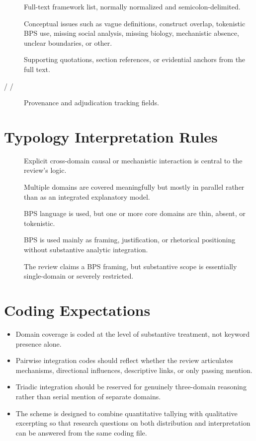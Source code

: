 \documentclass[11pt]{article}
\begin{document}
\begin{description}
\item[] Full-text framework list, normally normalized and semicolon-delimited.
\item[] Conceptual issues such as vague definitions, construct overlap, tokenistic BPS use, missing social analysis, missing biology, mechanistic absence, unclear boundaries, or other.
\item[] Supporting quotations, section references, or evidential anchors from the full text.
\item[ /  / ] Provenance and adjudication tracking fields.
\end{description}

\section*{Typology Interpretation Rules}
\begin{description}
\item[] Explicit cross-domain causal or mechanistic interaction is central to the review's logic.
\item[] Multiple domains are covered meaningfully but mostly in parallel rather than as an integrated explanatory model.
\item[] BPS language is used, but one or more core domains are thin, absent, or tokenistic.
\item[] BPS is used mainly as framing, justification, or rhetorical positioning without substantive analytic integration.
\item[] The review claims a BPS framing, but substantive scope is essentially single-domain or severely restricted.
\end{description}

\section*{Coding Expectations}
\begin{itemize}
\item Domain coverage is coded at the level of substantive treatment, not keyword presence alone.
\item Pairwise integration codes should reflect whether the review articulates mechanisms, directional influences, descriptive links, or only passing mention.
\item Triadic integration should be reserved for genuinely three-domain reasoning rather than serial mention of separate domains.
\item The scheme is designed to combine quantitative tallying with qualitative excerpting so that research questions on both distribution and interpretation can be answered from the same coding file.
\end{itemize}
\end{document}
